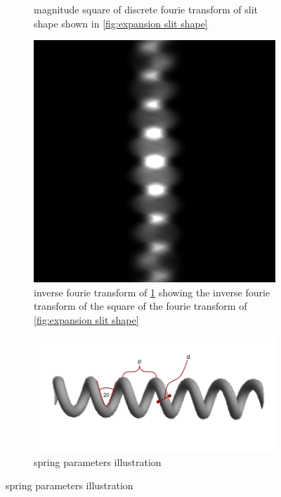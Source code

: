 \begin{figure}[H]
\begin{subfigure}{0.48\columnwidth}
        \caption{magnitude square of discrete fourie transform of slit shape shown in \ref{fig:expansion slit shape}}
        \label{fig:expansion interference simulation}
    \end{subfigure}
    \begin{subfigure}{0.48\columnwidth}
        \centering
        \includegraphics[width=\columnwidth]{figures/reverse fourie transform.png}
        \caption{inverse fourie transform of \ref{fig:expansion interference simulation} showing
        the inverse fourie transform of the square of the fourie transform of \ref{fig:expansion slit shape}}
        \label{fig:expansion inverse fourie transform}
    \end{subfigure}
    \begin{subfigure}{0.48\columnwidth}
        \centering
        \includegraphics[width=\columnwidth]{figures/spring parameters illustration.png}
        \caption{spring parameters illustration}
        \label{fig:spring parameters illustration}
    \end{subfigure}

    \label{fig:expansion theory illustrations}
\end{figure}
